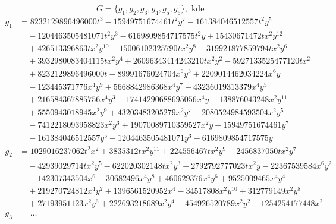 
$$ G = \{g_1, g_2, g_3, g_4, g_5, g_6 \}, \text{ kde } $$
\begin{align*}
g_1 &= 8232129896496000t^3 - 15949751674461t^2y^7 - 161384046512557t^2y^5 \\
&\quad - 1204463505481071t^2y^3 - 6169809854717575t^2y + 15430671472tx^2y^{12} \\
&\quad + 426513396863tx^2y^{10} - 15006102325790tx^2y^8 - 319921877859794tx^2y^6 \\
&\quad + 3932980083404115tx^2y^4 + 26096343414243210tx^2y^2 - 5927133525477120tx^2 \\
&\quad + 8232129896496000t - 89991676024704x^6y^3 + 2209014462034224x^6y \\
&\quad - 123445371776x^4y^9 + 5668842986368x^4y^7 - 43236019313379x^4y^5 \\ 
&\quad + 216584367885756x^4y^3 - 17414290688695056x^4y - 138876043248x^2y^{11} \\
&\quad + 5550943018945x^2y^9 + 43203483205279x^2y^7 - 2080524984593504x^2y^5 \\
&\quad - 7412218093958823x^2y^3 + 19070089710359527x^2y - 15949751674461y^7 \\
&\quad - 161384046512557y^5 - 1204463505481071y^3 - 6169809854717575y \\
g_2 &= 1029016237062t^2x^2 + 3835312tx^2y^{11} + 224556467tx^2y^9 + 2456837050tx^2y^7 \\
&\quad - 42939029714tx^2y^5 - 622020302148tx^2y^3 + 2792792777023tx^2y - 22367539584x^6y^2\\
&\quad - 142307343504x^6 - 30682496x^4y^8 + 460629376x^4y^6 + 9525009465x^4y^4 \\
&\quad + 219270724812x^4y^2 + 1396561520952x^4 - 34517808x^2y^{10} + 312779149x^2y^8 \\
&\quad + 27193951123x^2y^6 + 222693218689x^2y^4 + 454926520789x^2y^2 - 1254254177448x^2 \\
g_3 &= \dots 
\end{align*}